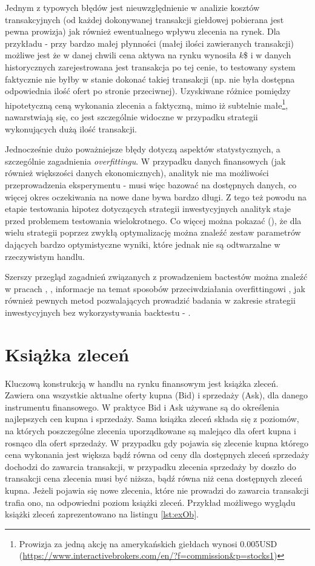 \documentclass[a4paper,12pt,openany, DIV=calc, headsepline]{scrbook}
\begin{document}
Jednym z typowych błędów jest nieuwzględnienie w analizie kosztów transakcyjnych (od każdej dokonywanej transakcji giełdowej pobierana jest pewna prowizja) jak również ewentualnego wpływu zlecenia na rynek. Dla przykładu - przy bardzo małej płynności (małej ilości zawieranych transakcji) możliwe jest że w danej chwili cena aktywa na rynku wynosiła $k$\$ i w danych historycznych zarejestrowana jest transakcja po tej cenie, to testowany system faktycznie nie byłby w stanie dokonać takiej transakcji (np. nie była dostępna odpowiednia ilość ofert po stronie przeciwnej). Uzyskiwane różnice pomiędzy hipotetyczną ceną wykonania zlecenia a faktyczną, mimo iż subtelnie małe\footnote{Prowizja za jedną akcję na amerykańskich giełdach wynosi 0.005USD (\url{https://www.interactivebrokers.com/en/?f=commission&p=stocks1})}, nawarstwiają się, co jest szczególnie widoczne w przypadku strategii wykonujących dużą ilość transakcji.

Jednocześnie dużo poważniejsze błędy dotyczą aspektów statystycznych, a szczególnie zagadnienia \emph{overfittingu}. W przypadku danych finansowych (jak również większości danych ekonomicznych), analityk nie ma możliwości przeprowadzenia eksperymentu - musi więc bazować na dostępnych danych, co więcej okres oczekiwania na nowe dane bywa bardzo długi. Z tego też powodu na etapie testowania hipotez dotyczących strategii inwestycyjnych analityk staje przed problemem testowania wielokrotnego. Co więcej można pokazać (\citep{bailey2013pseudo}), że dla wielu strategii poprzez zwykłą optymalizację można znaleźć zestaw parametrów dających bardzo optymistyczne wyniki, które jednak nie są odtwarzalne w rzeczywistym handlu.

Szerszy przegląd zagadnień związanych z prowadzeniem bactestów można znaleźć w pracach \citep{lopez2015backtesting}, \citep{bailey2014statistical}, informacje na temat sposobów przeciwdziałania overfittingowi \citep{bailey2014probability}, jak również pewnych metod pozwalających prowadzić badania w zakresie strategii inwestycyjnych bez wykorzystywania backtestu - \citep{carr2014determining}.


\section{Książka zleceń}


Kluczową konstrukcją w handlu na rynku finansowym jest książka zleceń. Zawiera ona wszystkie aktualne oferty kupna (Bid) i sprzedaży (Ask), dla danego instrumentu finansowego. W praktyce Bid i Ask używane są do określenia najlepszych cen kupna i sprzedaży. Sama książka zleceń składa się z poziomów, na których poszczególne zlecenia uporządkowane są malejąco dla ofert kupna i rosnąco dla ofert sprzedaży. W przypadku gdy pojawia się zlecenie kupna którego cena wykonania jest większa bądź równa od ceny dla dostępnych zleceń sprzedaży dochodzi do zawarcia transakcji, w przypadku zlecenia sprzedaży by doszło do transakcji cena zlecenia musi być niższa, bądź równa niż cena dostępnych zleceń kupna. Jeżeli pojawia się nowe zlecenia, które nie prowadzi do zawarcia transakcji trafia ono, na odpowiedni poziom książki zleceń. Przykład możliwego wyglądu książki zleceń zaprezentowano na listingu \ref{lst:exOb}.
\end{document}

